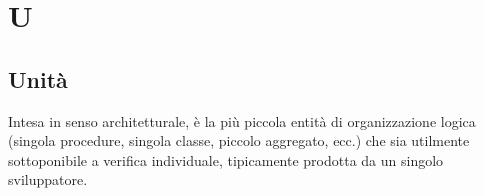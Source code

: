 \section{U}

    \subsection{Unità}
    \label{glossario:unita}
    Intesa in senso architetturale, è la più piccola entità di organizzazione logica (singola procedure, singola classe, piccolo aggregato, ecc.) che sia utilmente sottoponibile a verifica individuale, tipicamente prodotta da un singolo sviluppatore.


\pagebreak